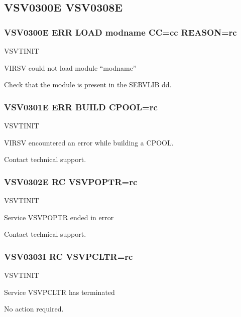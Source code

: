 \documentclass[letterpaper,10pt,english]{sphinxmanual}
\begin{document}
\subsection{VSV0300E \sphinxhyphen{} VSV0308E}
\label{\detokenize{messages:vsv0300e-vsv0308e}}

\subsubsection{VSV0300E ERR LOAD modname CC=cc REASON=rc}
\label{\detokenize{messages:vsv0300e-err-load-modname-cc-cc-reason-rc}}\begin{description}
\sphinxAtStartPar
VSVTINIT

\sphinxAtStartPar
VIRSV could not load module “modname”

\sphinxAtStartPar
Check that the module is present in the SERVLIB dd.

\end{description}


\subsubsection{VSV0301E ERR BUILD CPOOL=rc}
\label{\detokenize{messages:vsv0301e-err-build-cpool-rc}}\begin{description}
\sphinxAtStartPar
VSVTINIT

\sphinxAtStartPar
VIRSV encountered an error while building a CPOOL.

\sphinxAtStartPar
Contact technical support.

\end{description}


\subsubsection{VSV0302E RC VSVPOPTR=rc}
\label{\detokenize{messages:vsv0302e-rc-vsvpoptr-rc}}\begin{description}
\sphinxAtStartPar
VSVTINIT

\sphinxAtStartPar
Service VSVPOPTR ended in error

\sphinxAtStartPar
Contact technical support.

\end{description}


\subsubsection{VSV0303I RC VSVPCLTR=rc}
\label{\detokenize{messages:vsv0303i-rc-vsvpcltr-rc}}\begin{description}
\sphinxAtStartPar
VSVTINIT

\sphinxAtStartPar
Service VSVPCLTR has terminated

\sphinxAtStartPar
No action required.

\end{description}
\end{document}
